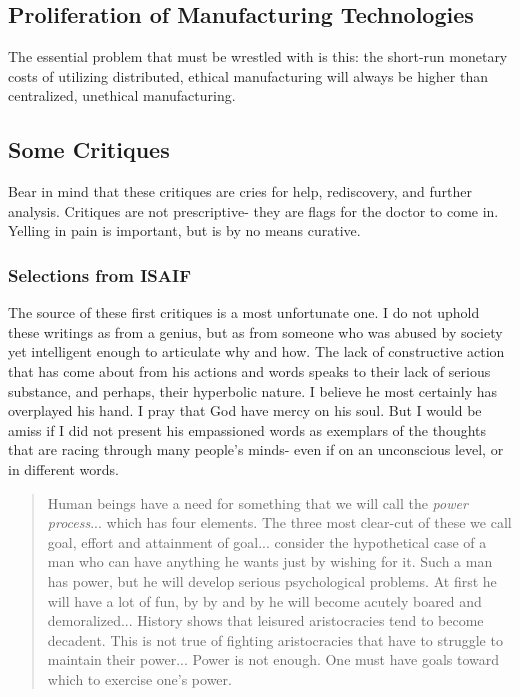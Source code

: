 \documentclass[letterpaper]{article}
\begin{document}
\subsection{Proliferation of Manufacturing Technologies}

The essential problem that must be wrestled with is this: the short-run monetary costs of utilizing distributed, ethical manufacturing will always be higher than centralized, unethical manufacturing.



\iffalse

\subsection{Some Critiques}

Bear in mind that these critiques are cries for help, rediscovery, and further analysis. Critiques are not prescriptive- they are flags for the doctor to come in. Yelling in pain is important, but is by no means curative.



\subsubsection{Selections from ISAIF}

The source of these first critiques is a most unfortunate one. I do not uphold these writings as from a genius, but as from someone who was abused by society yet intelligent enough to articulate why and how. The lack of constructive action that has come about from his actions and words speaks to their lack of serious substance, and perhaps, their hyperbolic nature. I believe he most certainly has overplayed his hand. I pray that God have mercy on his soul. But I would be amiss if I did not present his empassioned words as exemplars of the thoughts that are racing through many people's minds- even if on an unconscious level, or in different words.

\begin{quote}
Human beings have a need for something that we will call the \textit{power process}... which has four elements. The three most clear-cut of these we call goal, effort and attainment of goal... consider the hypothetical case of a man who can have anything he wants just by wishing for it. Such a man has power, but he will develop serious psychological problems. At first he will have a lot of fun, by by and by he will become acutely boared and demoralized... History shows that leisured aristocracies tend to become decadent. This is not true of fighting aristocracies that have to struggle to maintain their power... Power is not enough. One must have goals toward which to exercise one's power.
\end{quote}
\end{document}
